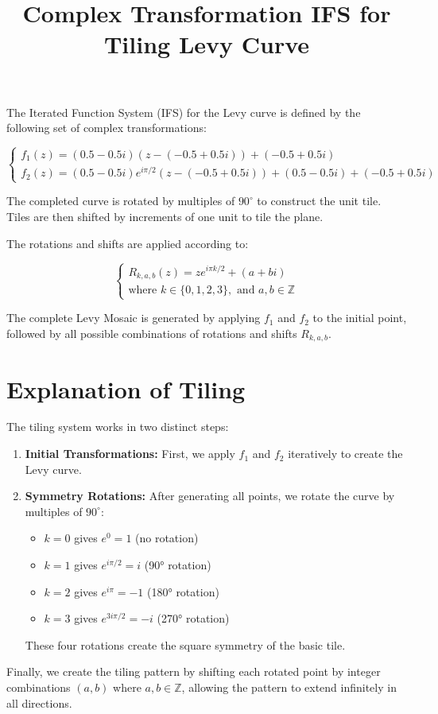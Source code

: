\documentclass{article}
\title{Complex Transformation IFS for Tiling Levy Curve}
\author{}
\date{}
\begin{document}
\maketitle

The Iterated Function System (IFS) for the Levy curve is defined by the following set of complex transformations:

\begin{equation}
\begin{cases} 
f_1(z) = (0.5 - 0.5i)(z - (-0.5 + 0.5i)) + (-0.5 + 0.5i) \\
f_2(z) = (0.5 - 0.5i)e^{i\pi/2}(z - (-0.5 + 0.5i)) + (0.5 - 0.5i) + (-0.5 + 0.5i)
\end{cases}
\end{equation}

The completed curve is rotated by multiples of $90^\circ$ to construct the unit tile.
Tiles are then shifted by increments of one unit to tile the plane.

The rotations and shifts are applied according to:

\begin{equation}
\begin{cases}
R_{k,a,b}(z) = ze^{i\pi k/2} + (a + bi) \\
\text{where } k \in \{0,1,2,3\}, \text{ and } a,b \in \mathbb{Z}
\end{cases}
\end{equation}

The complete Levy Mosaic is generated by applying $f_1$ and $f_2$ to the initial point, followed by all possible combinations of rotations and shifts $R_{k,a,b}$.

\section*{Explanation of Tiling}
The tiling system works in two distinct steps:

\begin{enumerate}
    \item \textbf{Initial Transformations:} First, we apply $f_1$ and $f_2$ iteratively to create the Levy curve.
    
    \item \textbf{Symmetry Rotations:} After generating all points, we rotate the curve by multiples of $90^\circ$:
    \begin{itemize}
        \item $k=0$ gives $e^{0} = 1$ (no rotation)
        \item $k=1$ gives $e^{i\pi/2} = i$ (90° rotation)
        \item $k=2$ gives $e^{i\pi} = -1$ (180° rotation)
        \item $k=3$ gives $e^{3i\pi/2} = -i$ (270° rotation)
    \end{itemize}
    
    These four rotations create the square symmetry of the basic tile.
\end{enumerate}

Finally, we create the tiling pattern by shifting each rotated point by integer combinations $(a,b)$ where $a,b \in \mathbb{Z}$, allowing the pattern to extend infinitely in all directions.
\end{document}
